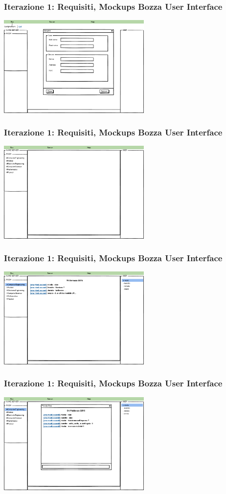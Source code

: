 \documentclass[t]{beamer} %
\begin{document}
\begin{frame}
 \frametitle{Iterazione 1: Requisiti, Mockups Bozza User Interface}
    \includegraphics[height=190px, width=286px,]{image_mockups/05_siuc_config_network.png}{\centering}
\end{frame}

\begin{frame}
 \frametitle{Iterazione 1: Requisiti, Mockups Bozza User Interface}
    \includegraphics[height=190px, width=286px,]{image_mockups/06_siuc_connect.png}{\centering}
\end{frame}

\begin{frame}
 \frametitle{Iterazione 1: Requisiti, Mockups Bozza User Interface}
    \includegraphics[height=190px, width=286px,]{image_mockups/07_siuc_user_room_ce.png}{\centering}
\end{frame}

\begin{frame}
 \frametitle{Iterazione 1: Requisiti, Mockups Bozza User Interface}
    \includegraphics[height=190px, width=286px,]{image_mockups/08_siuc_user_room_ce_private.png}{\centering}
\end{frame}
\end{document}
